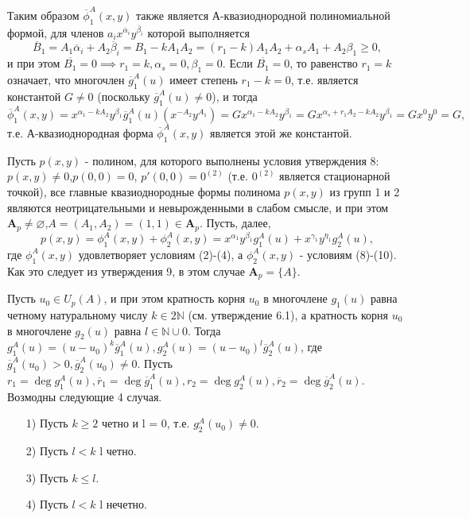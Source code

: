 \documentclass[11pt,reqno]{amsart}
\theoremstyle{plain}
\theoremstyle{definition}
\begin{document}
Таким образом $\overline{\phi}^A_1(x,y)$ также является А-квазиоднородной полиномиальной формой, для членов $a_i x^{\overline{\alpha}_i} y^{\overline{\beta}_i}$ которой выполняется
$$
\overline{B}_1 = A_1 \overline{\alpha}_i + A_2 \overline{\beta}_i = B_1 - kA_1A_2 = (r_1 - k)A_1A_2 + \alpha_s A_1 + A_2 \beta _1 \geq 0,
$$
и при этом $\overline{B_1} = 0 \implies r_1 = k, \alpha_s = 0, \beta_1 = 0$. Если $\overline{B_1} = 0$, то равенство $r_1 = k$ означает, что многочлен $\overline{g}^A_1(u)$ имеет степень $r_1 - k = 0$, т.е. является константой $G \ne 0$ (поскольку $\overline{g}^A_1(u) \ne 0$), и тогда
$$
\overline{\phi}^A_1(x,y) = x^{\alpha_1 - k A_2}y^{\beta_1} \overline{g}^A_1(u)(x^{-A_2}y^{A_1}) = Gx^{\alpha_1 - k A_2}y^{\beta_1} = Gx^{\alpha_s + r_1A_2 - kA_2}y^{\beta_1} = Gx^0y^0 = G,
$$
т.е. А-квазиоднородная форма $\overline{\phi}^A_1(x,y)$ является этой же константой.

Пусть $p(x,y)$ - полином, для которого выполнены условия утверждения 8: $p(x,y) \ne 0$,$p(0,0) = 0$, $p'(0,0) = 0^{(2)}$ (т.е. $0^{(2)}$ является стационарной точкой), все главные квазиоднородные формы полинома $p(x,y)$ из групп 1 и 2 являются неотрицательными и невырожденными в слабом смысле, и при этом $\mathbf{A}_p \ne \varnothing$,$A=(A_1, A_2)=(1,1) \in \mathbf{A}_p$. Пусть, далее,
$$
p(x,y) = \phi^A_1(x,y)+\phi^A_2(x,y) = x^{\alpha_1}y^{\beta_1}g^A_1(u)+x^{\gamma_1}y^{\eta_1}g^A_2(u),
$$
где $\phi^A_1(x,y)$ удовлетворяет условиям (2)-(4), а $\phi^A_2(x,y)$ - условиям (8)-(10). Как это следует из утверждения 9, в этом случае $\mathbf{A}_p = \{A\}$.

Пусть $u_0 \in U_p(A)$, и при этом кратность корня $u_0$ в многочлене $g_1(u)$ равна четному натуральному числу $k \in 2\mathbb{N}$ (см. утверждение 6.1), а кратность корня $u_0$ в многочлене $g_2(u)$ равна $l \in \mathbb{N} \cup {0}$. Тогда $g^A_1(u) = (u - u_0)^k \overline{g}^A_1(u), g^A_2(u) = (u - u_0)^l\overline{g}^A_2(u)$, где $\overline{g}^A_1(u_0) > 0, \overline{g}^A_2(u_0) \ne 0$. Пусть $r_1 = \deg g^A_1(u), \overline{r}_1 = \deg \overline{g}^A_1(u), r_2 = \deg g^A_2(u), \overline{r}_2 = \deg \overline{g}^A_2(u)$.\\
Возмодны следующие 4 случая.
\begin{enumerate}
    \item[1)] Пусть $k \geq 2$ четно и l = 0, т.е. $g^A_2(u_0) \ne 0$.
    \item[2)] Пусть $l < k$ l четно.
    \item[3)] Пусть $k \leq l$.
    \item[4)] Пусть $l < k$ l нечетно.
\end{enumerate}
\end{document}
